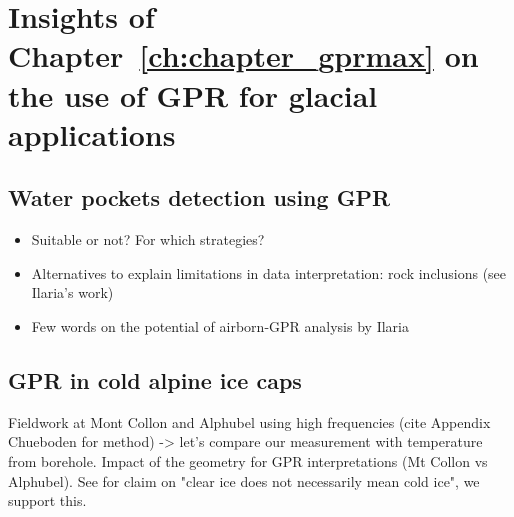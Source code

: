 



\section{Insights of Chapter~\ref{ch:chapter_gprmax} on the use of GPR for glacial applications}


\subsection{Water pockets detection using GPR}

\begin{itemize}
    \item Suitable or not? For which strategies? 
    \item Alternatives to explain limitations in data interpretation: rock inclusions (see Ilaria's work)
    \item Few words on the potential of airborn-GPR analysis by Ilaria
\end{itemize}

\subsection{GPR in cold alpine ice caps}

Fieldwork at Mont Collon and Alphubel using high frequencies (cite Appendix Chueboden for method) -> let's compare our measurement with temperature from borehole. Impact of the geometry for GPR interpretations (Mt Collon vs Alphubel). See \cite{Brown&al2009} for claim on "clear ice does not necessarily mean cold ice", we support this. 

